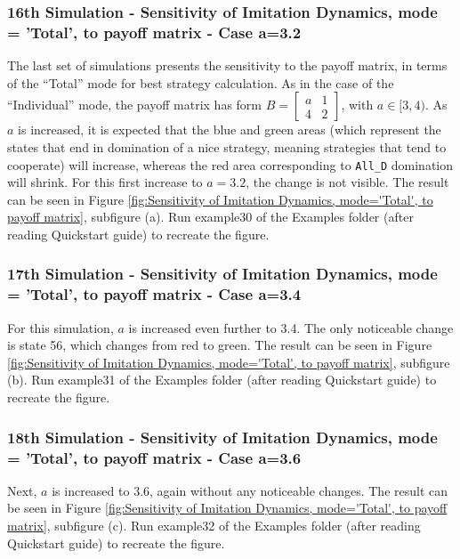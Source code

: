 \subsubsection{16th Simulation - Sensitivity of Imitation Dynamics, mode = 'Total', to payoff matrix - Case a=3.2}
The last set of simulations presents the sensitivity to the payoff matrix, in terms of the ``Total'' mode for best strategy calculation. As in the case of the ``Individual'' mode, the payoff matrix has form $B = \begin{bmatrix} a & 1 \\ 4 & 2 \end{bmatrix}$, with $a \in [3,4)$. As $a$ is increased, it is expected that the blue and green areas (which represent the states that end in domination of a nice strategy, meaning strategies that tend to cooperate) will increase, whereas the red area corresponding to \texttt{All\_D} domination will shrink. For this first increase to $a=3.2$, the change is not visible. The result can be seen in Figure \ref{fig:Sensitivity of Imitation Dynamics, mode='Total', to payoff matrix}, subfigure (a). Run example30 of the Examples folder (after reading Quickstart guide) to recreate the figure.

\subsubsection{17th Simulation - Sensitivity of Imitation Dynamics, mode = 'Total', to payoff matrix - Case a=3.4}
For this simulation, $a$ is increased even further to 3.4. The only noticeable change is state 56, which changes from red to green. The result can be seen in Figure \ref{fig:Sensitivity of Imitation Dynamics, mode='Total', to payoff matrix}, subfigure (b). Run example31 of the Examples folder (after reading Quickstart guide) to recreate the figure.

\subsubsection{18th Simulation - Sensitivity of Imitation Dynamics, mode = 'Total', to payoff matrix - Case a=3.6}
Next, $a$ is increased to 3.6, again without any noticeable changes. The result can be seen in Figure \ref{fig:Sensitivity of Imitation Dynamics, mode='Total', to payoff matrix}, subfigure (c). Run example32 of the Examples folder (after reading Quickstart guide) to recreate the figure.

